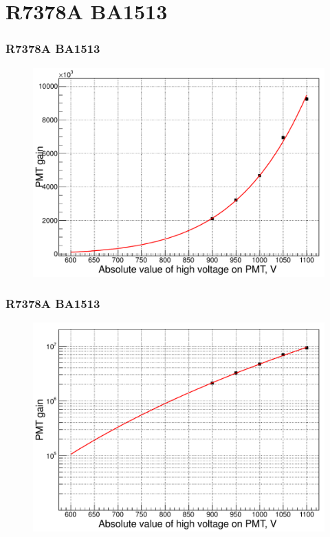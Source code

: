 \documentclass{beamer}
\begin{document}
\section{R7378A BA1513}
\begin{frame}
\frametitle{R7378A BA1513}
\begin{figure}
  \includegraphics[width=0.95\linewidth]{./pmtGainR7378A_BA1513.pdf}
\end{figure}
\end{frame}
\begin{frame}
\frametitle{R7378A BA1513}
\begin{figure}
  \includegraphics[width=0.95\linewidth]{./pmtGainR7378A_BA1513_log.pdf}
\end{figure}
\end{frame}
\end{document}
